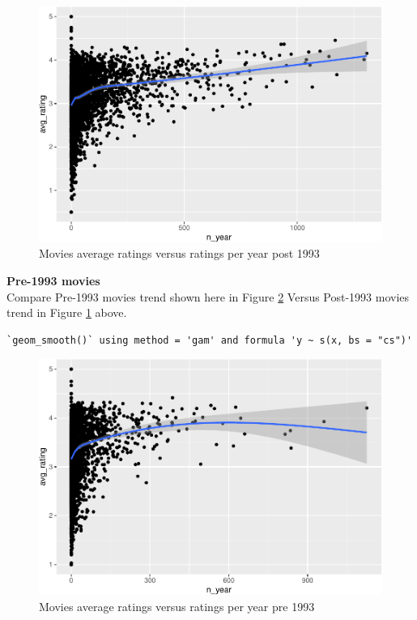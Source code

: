 \documentclass[
]{article}
\begin{document}
\begin{figure}
\centering
\includegraphics{figures/md_4-1.pdf}
\caption{Movies average ratings versus ratings per year post
1993\label{fig:movies_average_ratings_versus_ratings_per_year_post_1993}}
\end{figure}

\newpage

\textbf{Pre-1993 movies}\\
Compare Pre-1993 movies trend shown here in Figure
\ref{fig:movies_average_ratings_versus_ratings_per_year_pre_1993} Versus
Post-1993 movies trend in Figure
\ref{fig:movies_average_ratings_versus_ratings_per_year_post_1993}
above.

\begin{verbatim}
`geom_smooth()` using method = 'gam' and formula 'y ~ s(x, bs = "cs")'
\end{verbatim}

\begin{figure}
\centering
\includegraphics{figures/md_5-1.pdf}
\caption{Movies average ratings versus ratings per year pre
1993\label{fig:movies_average_ratings_versus_ratings_per_year_pre_1993}}
\end{figure}
\end{document}

